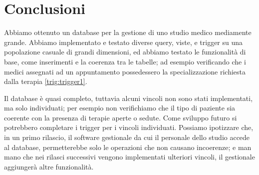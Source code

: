 \documentclass[11pt]{article}
\begin{document}
\section{Conclusioni}
Abbiamo ottenuto un database per la gestione di uno studio medico mediamente grande. Abbiamo implementato e testato diverse query, viste, e trigger su una popolazione casuale di grandi dimensioni, ed abbiamo testato le funzionalità di base, come inserimenti e la coerenza tra le tabelle; ad esempio verificando che i medici assegnati ad un appuntamento possedessero la specializzazione richiesta dalla terapia \ref{trig:trigger1}.

Il database è quasi completo, tuttavia alcuni vincoli non sono stati implementati, ma solo individuati; per esempio non verifichiamo che il tipo di paziente sia coerente con la presenza di terapie aperte o sedute. Come sviluppo futuro si potrebbero completare i trigger per i vincoli individuati. Possiamo ipotizzare che, in un primo rilascio, il software gestionale da cui il personale dello studio accede al database, permetterebbe solo le operazioni che non causano incoerenze; e man mano che nei rilasci successivi vengono implementati ulteriori vincoli, il gestionale aggiungerà altre funzionalità.
\end{document}

